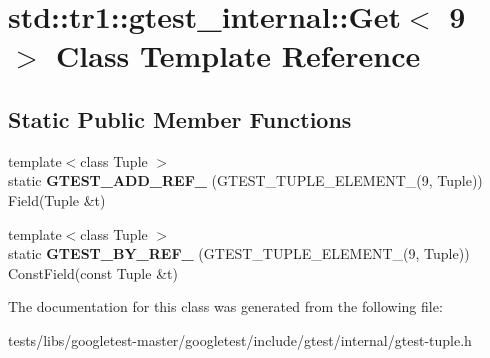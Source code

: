 \hypertarget{classstd_1_1tr1_1_1gtest__internal_1_1Get_3_019_01_4}{}\section{std\+:\+:tr1\+:\+:gtest\+\_\+internal\+:\+:Get$<$ 9 $>$ Class Template Reference}
\label{classstd_1_1tr1_1_1gtest__internal_1_1Get_3_019_01_4}
\subsection*{Static Public Member Functions}
\begin{DoxyCompactItemize}
\item 
\mbox{\label{classstd_1_1tr1_1_1gtest__internal_1_1Get_3_019_01_4_add31197dfdb381d265e221ed62129f45}} 
{\footnotesize template$<$class Tuple $>$ }\\static {\bfseries G\+T\+E\+S\+T\+\_\+\+A\+D\+D\+\_\+\+R\+E\+F\+\_\+} (G\+T\+E\+S\+T\+\_\+\+T\+U\+P\+L\+E\+\_\+\+E\+L\+E\+M\+E\+N\+T\+\_\+(9, Tuple)) Field(Tuple \&t)
\item 
\mbox{\label{classstd_1_1tr1_1_1gtest__internal_1_1Get_3_019_01_4_a5205e8da729e2bee446f5be0c65390af}} 
{\footnotesize template$<$class Tuple $>$ }\\static {\bfseries G\+T\+E\+S\+T\+\_\+\+B\+Y\+\_\+\+R\+E\+F\+\_\+} (G\+T\+E\+S\+T\+\_\+\+T\+U\+P\+L\+E\+\_\+\+E\+L\+E\+M\+E\+N\+T\+\_\+(9, Tuple)) Const\+Field(const Tuple \&t)
\end{DoxyCompactItemize}


The documentation for this class was generated from the following file\+:\begin{DoxyCompactItemize}
\item 
tests/libs/googletest-\/master/googletest/include/gtest/internal/gtest-\/tuple.\+h\end{DoxyCompactItemize}
